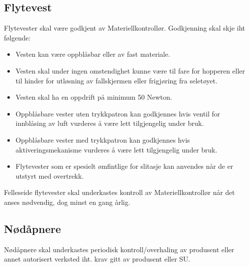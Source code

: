 \subsection{Flytevest}
Flytevester skal være godkjent av Materiellkontrollør. Godkjenning skal skje iht følgende:
\begin{itemize}
	\item Vesten kan være oppblåsbar eller av fast materiale.
	\item Vesten skal under ingen omstendighet kunne være til fare for hopperen eller til hinder for utløsning av fallskjermen eller frigjøring fra seletøyet.
	\item Vesten skal ha en oppdrift på minimum 50 Newton.
	\item Oppblåsbare vester uten trykkpatron kan godkjennes hvis ventil for innblåsing av luft vurderes å være lett tilgjengelig under bruk.
	\item Oppblåsbare vester med trykkpatron kan godkjennes hvis aktiveringsmekanisme vurderes å være lett tilgjengelig under bruk.
	\item Flytevester som er spesielt ømfintlige for slitasje kan anvendes når de er utstyrt med overtrekk.
\end{itemize}

Felleseide flytevester skal underkastes kontroll av Materiellkontrollør når det anses nødvendig, dog minst en gang årlig.

\subsection{Nødåpnere}
Nødåpnere skal underkastes periodisk kontroll/overhaling av produsent eller annet autorisert verksted iht. krav gitt av produsent eller SU.
